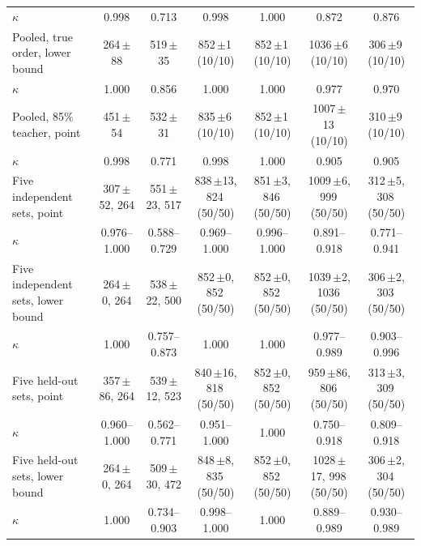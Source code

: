 \begin{table}[t]
{\begin{tabular}{lcccccc}
\quad $\kappa$ & 0.998 & 0.713 & 0.998 & 1.000 & 0.872 & 0.876 \\
Pooled, true order, lower bound & 264\,{\scriptsize$\pm$88} & 519\,{\scriptsize$\pm$35} & 852\,{\scriptsize$\pm$1}\,(10/10) & 852\,{\scriptsize$\pm$1}\,(10/10) & 1036\,{\scriptsize$\pm$6}\,(10/10) & 306\,{\scriptsize$\pm$9}\,(10/10) \\
\quad $\kappa$ & 1.000 & 0.856 & 1.000 & 1.000 & 0.977 & 0.970 \\
Pooled, 85\% teacher, point & 451\,{\scriptsize$\pm$54} & 532\,{\scriptsize$\pm$31} & 835\,{\scriptsize$\pm$6}\,(10/10) & 852\,{\scriptsize$\pm$1}\,(10/10) & 1007\,{\scriptsize$\pm$13}\,(10/10) & 310\,{\scriptsize$\pm$9}\,(10/10) \\
\quad $\kappa$ & 0.998 & 0.771 & 0.998 & 1.000 & 0.905 & 0.905 \\
\midrule
Five independent sets, point & 307\,{\scriptsize$\pm$52}, 264 & 551\,{\scriptsize$\pm$23}, 517 & 838\,{\scriptsize$\pm$13}, 824\,(50/50) & 851\,{\scriptsize$\pm$3}, 846\,(50/50) & 1009\,{\scriptsize$\pm$6}, 999\,(50/50) & 312\,{\scriptsize$\pm$5}, 308\,(50/50) \\
\quad $\kappa$ & 0.976--1.000 & 0.588--0.729 & 0.969--1.000 & 0.996--1.000 & 0.891--0.918 & 0.771--0.941 \\
Five independent sets, lower bound & 264\,{\scriptsize$\pm$0}, 264 & 538\,{\scriptsize$\pm$22}, 500 & 852\,{\scriptsize$\pm$0}, 852\,(50/50) & 852\,{\scriptsize$\pm$0}, 852\,(50/50) & 1039\,{\scriptsize$\pm$2}, 1036\,(50/50) & 306\,{\scriptsize$\pm$2}, 303\,(50/50) \\
\quad $\kappa$ & 1.000 & 0.757--0.873 & 1.000 & 1.000 & 0.977--0.989 & 0.903--0.996 \\
Five held-out sets, point & 357\,{\scriptsize$\pm$86}, 264 & 539\,{\scriptsize$\pm$12}, 523 & 840\,{\scriptsize$\pm$16}, 818\,(50/50) & 852\,{\scriptsize$\pm$0}, 852\,(50/50) & 959\,{\scriptsize$\pm$86}, 806\,(50/50) & 313\,{\scriptsize$\pm$3}, 309\,(50/50) \\
\quad $\kappa$ & 0.960--1.000 & 0.562--0.771 & 0.951--1.000 & 1.000 & 0.750--0.918 & 0.809--0.918 \\
Five held-out sets, lower bound & 264\,{\scriptsize$\pm$0}, 264 & 509\,{\scriptsize$\pm$30}, 472 & 848\,{\scriptsize$\pm$8}, 835\,(50/50) & 852\,{\scriptsize$\pm$0}, 852\,(50/50) & 1028\,{\scriptsize$\pm$17}, 998\,(50/50) & 306\,{\scriptsize$\pm$2}, 304\,(50/50) \\
\quad $\kappa$ & 1.000 & 0.734--0.903 & 0.998--1.000 & 1.000 & 0.889--0.989 & 0.930--0.989 \\
\bottomrule
\end{tabular}}
\end{table}
